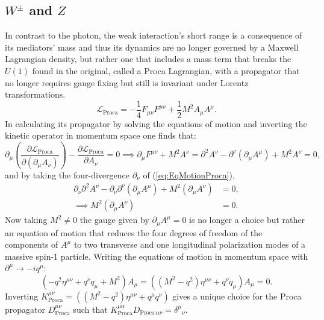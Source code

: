 \subsection{$W^{\pm}$ and $Z$}
In contrast to the photon, the weak interaction's short range is a consequence of its mediators' mass and thus its dynamics are no longer governed by a Maxwell Lagrangian density, but rather one that includes a mass term that breaks the $U(1)$ found in the original, called a Proca Lagrangian, with a propagator that no longer requires gauge fixing but still is invariant under Lorentz transformations.
\begin{equation}\label{eq:L_Proca}
  \mathcal{L}_{\text{Proca}} = -\frac{1}{4}F_{\mu\nu}F^{\mu\nu} 
  + \frac{1}{2}M^2 A_\mu A^\mu.
\end{equation}
In calculating its propagator by solving the equations of motion and inverting the kinetic operator in momentum space one finds that:
\begin{equation}\label{eq:EqMotionProca}
\partial_\mu \left(\frac{\partial \mathcal{L}_\text{Proca}}
{\partial(\partial_\mu A_\nu)}\right) 
- \frac{\partial \mathcal{L}_\text{Proca}}{\partial A_\nu} = 0 
\implies \partial_\mu F^{\mu \nu} + M^2 A^{\nu}= 
\partial^2 A^\nu - \partial^{\nu}(\partial_\mu A^\mu) + M^2 A^{\nu} = 0,
\end{equation}
and by taking the four-divergence $\partial_\nu$ of (\ref{eq:EqMotionProca}),
\begin{equation}
  \begin{split}
\partial_\nu \partial^2 A^\nu - \partial_\nu \partial^{\nu}(\partial_\mu A^\mu) + M^2(\partial_\mu A^{\nu}) &= 0, \\
\implies M^2(\partial_\mu A^{\nu}) &= 0.
  \end{split}
\end{equation}
Now taking $M^2\neq 0$ the gauge given by $\partial_\mu A^\mu = 0$ is no longer a choice but rather an equation of motion that reduces the four degrees of freedom of the components of $A^\mu$ to two transverse and one longitudinal polarization modes of a massive spin-1 particle. Writing the equations of motion in momentum space with $\partial^\mu \rightarrow -iq^\mu$:
\begin{equation}
  (-q^2 \eta^{\mu \nu}+ q^{\nu}q_\mu + M^2)A_\mu = ( (M^2-q^2) \eta^{\mu \nu}+ q^{\nu}q_\mu )A_\mu =0.
\end{equation}
Inverting $K^{\mu\nu}_{\text{Proca}} = ((M^2-q^2)\eta^{\mu\nu} + q^\mu q^\nu)$ gives a unique choice for the Proca propagator $D^{\mu\nu}_{\text{Proca}}$ such that $K^{\mu\alpha}_{\text{Proca}}D_{\text{Proca}\,\alpha\nu} = \delta^{\mu}{}_{\nu}$.
